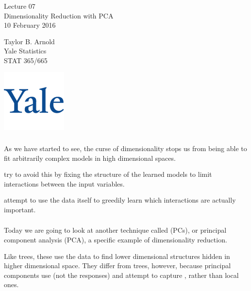 \documentclass[xetex,mathserif,serif,aspectratio=169]{beamer}
\begin{document}
\begin{frame}[fragile] \frametitle{} \oldB \small

\vfill

{\fontsize{0.7cm}{0cm}\selectfont Lecture 07 \\\vspace{0.2cm} Dimensionality Reduction with PCA}\\\vspace{0.5cm}
10 February 2016

\vspace{2cm}

\begin{minipage}{0.6\textwidth}
Taylor B. Arnold \\
Yale Statistics \\
STAT 365/665
\end{minipage}
\hfill
\begin{minipage}{0.3\textwidth}\raggedleft
\includegraphics[scale=0.3]{../yale-logo.png}
\end{minipage}%

\end{frame}

\begin{frame}[fragile] \frametitle{}  \oldB \small

As we have started to see, the curse of dimensionality stops
us from being able to fit arbitrarily complex models in high
dimensional spaces.

 try to avoid this by fixing the structure
of the learned models to limit interactions between the input variables.

 attempt to use the data itself to greedily
learn which interactions are actually important.

\end{frame}

\begin{frame}[fragile] \frametitle{}  \oldB \small

Today we are going to look at another technique called
 (PCs), or principal component
analysis (PCA), a specific example of dimensionality
reduction.

Like trees, these use the data to find lower dimensional structures
hidden in higher dimensional space. They differ from trees, however,
because principal components use  (not
the responses) and attempt to capture ,
rather than local ones.

\end{frame}
\end{document}
